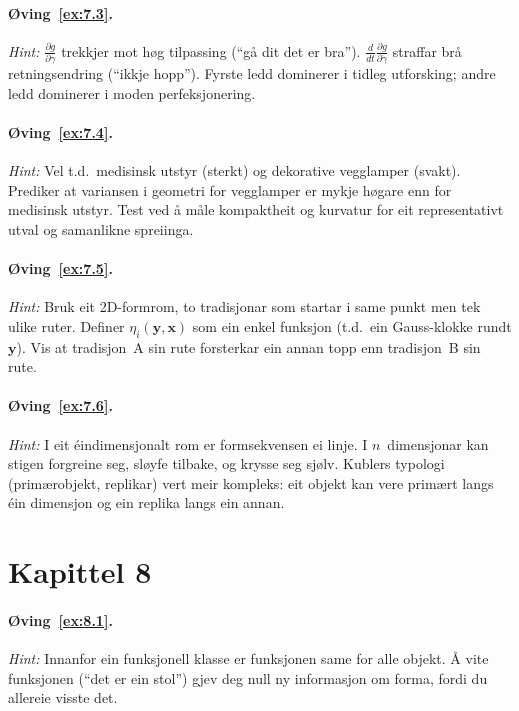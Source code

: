 \paragraph{Øving~\ref{ex:7.3}.}
\emph{Hint:} $\frac{\partial g}{\partial \gamma}$ trekkjer mot
høg tilpassing (``gå dit det er bra''). $\frac{d}{dt}
\frac{\partial g}{\partial \dot{\gamma}}$ straffar brå retningsendring
(``ikkje hopp''). Fyrste ledd dominerer i tidleg
utforsking; andre ledd dominerer i moden perfeksjonering.

\paragraph{Øving~\ref{ex:7.4}.}
\emph{Hint:} Vel t.d.\ medisinsk utstyr (sterkt) og
dekorative vegglamper (svakt). Prediker at variansen i
geometri for vegglamper er mykje høgare enn for medisinsk utstyr.
Test ved å måle kompaktheit og kurvatur for eit representativt
utval og samanlikne spreiinga.

\paragraph{Øving~\ref{ex:7.5}.}
\emph{Hint:} Bruk eit 2D-formrom, to tradisjonar som startar i
same punkt men tek ulike ruter. Definer
$\eta_i(\bm{y}, \bm{x})$ som ein enkel funksjon (t.d.\ ein
Gauss-klokke rundt $\bm{y}$). Vis at tradisjon~A sin rute
forsterkar ein annan topp enn tradisjon~B sin rute.

\paragraph{Øving~\ref{ex:7.6}.}
\emph{Hint:} I eit éindimensjonalt rom er formsekvensen ei linje.
I $n$~dimensjonar kan stigen forgreine seg, sløyfe tilbake, og
krysse seg sjølv. Kublers typologi (primærobjekt, replikar)
vert meir kompleks: eit objekt kan vere primært langs éin
dimensjon og ein replika langs ein annan.


\section*{Kapittel 8}

\paragraph{Øving~\ref{ex:8.1}.}
\emph{Hint:} Innanfor ein funksjonell klasse er funksjonen same
for alle objekt. Å vite funksjonen (``det er ein stol'') gjev deg
null ny informasjon om forma, fordi du allereie visste det.

